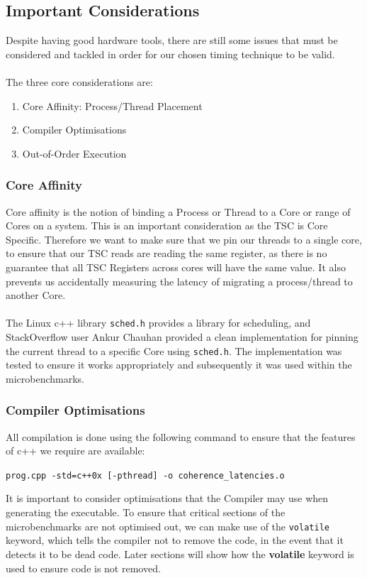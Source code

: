 \documentclass[bsc,frontabs,twoside,singlespacing,parskip,deptreport]{infthesis}     %
\begin{document}
\subsection{Important Considerations}
Despite having good hardware tools, there are still some issues that must be considered and tackled in order for our chosen timing technique to be valid. \\
\\
The three core considerations are:
\begin{enumerate}
    \item Core Affinity: Process/Thread Placement
    \item Compiler Optimisations
    \item Out-of-Order Execution
\end{enumerate}

\subsubsection{Core Affinity}
Core affinity is the notion of binding a Process or Thread to a Core or range of Cores on a system. This is an important consideration as the  TSC is Core Specific. Therefore we want to make sure that we pin our threads to a single core, to ensure that our TSC reads are reading the same register, as there is no guarantee that all TSC Registers across cores will have the same value. It also prevents us accidentally measuring the latency of migrating a process/thread to another Core.\\
\\
The Linux c++ library \texttt{sched.h} provides a library for scheduling, and StackOverflow user Ankur Chauhan provided a clean implementation\cite{corepin_src} for pinning the current thread to a specific Core using \texttt{sched.h}. The implementation was tested to ensure it works appropriately and subsequently it was used within the microbenchmarks.

\subsubsection{Compiler Optimisations}\label{compiler-optimisations}

All compilation is done using the following command to ensure that the features of c++ we require are available:
\begin{center}
    \texttt{prog.cpp -std=c++0x [-pthread] -o coherence\_latencies.o}
\end{center}
It is important to consider optimisations that the Compiler may use when generating the executable. To ensure that critical sections of the microbenchmarks are not optimised out, we can make use of the \texttt{volatile} keyword, which tells the compiler not to remove the code, in the event that it detects it to be dead code. Later sections will show how the \textbf{volatile} keyword is used to ensure code is not removed.
\end{document}

